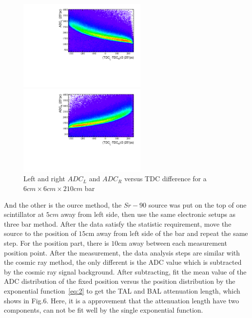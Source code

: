 \begin{figure}[h!]
\begin{minipage}[h]{0.5\linewidth}
\centering
\includegraphics[width=2.5in]{ye/fig_ye_scintillator/c2_L.pdf}
\end{minipage}%
\begin{minipage}[h]{0.5\linewidth}
\centering
\includegraphics[width=2.5in]{ye/fig_ye_scintillator/c2_R.pdf}
\end{minipage}
\caption{Left and right $ADC_{L}$ and $ADC_{R}$ versus TDC difference for a $6cm\times6cm\times210cm$ bar}
\label{f:ADCTDC}
\end{figure}


And the other is the ource method, the $Sr-90$ source was put on the top of one scintillator at $5cm$ away from left side, then use the same electronic setups as three bar method. After the data satisfy the statistic requirement, move the source to the position of $15$cm away from left side of the bar and repeat the same step. For the position part, there is $10$cm away between each measurement position point. After the measurement, the data analysis steps are similar with the cosmic ray method, the only different is the ADC value which is subtracted by the cosmic ray signal background. After subtracting, fit the mean value of the ADC distribution of the fixed position versus the position distribution by the exponential function~\ref{eq:2} to get the TAL and BAL attenuation length, which shows in Fig.6. Here, it is a approvement that the attenuation length have two components, can not be fit well by the single exponential function.

